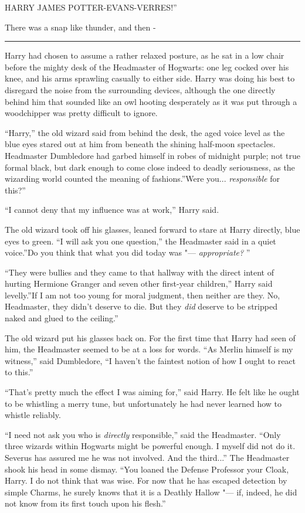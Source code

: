 HARRY JAMES POTTER-EVANS-VERRES!''

There was a snap like thunder, and then -

\begin{center}\rule{3in}{0.4pt}\end{center}

Harry had chosen to assume a rather relaxed posture, as he sat in a low
chair before the mighty desk of the Headmaster of Hogwarts: one leg
cocked over his knee, and his arms sprawling casually to either side.
Harry was doing his best to disregard the noise from the surrounding
devices, although the one directly behind him that sounded like an owl
hooting desperately as it was put through a woodchipper was pretty
difficult to ignore.

``Harry,'' the old wizard said from behind the desk, the aged voice
level as the blue eyes stared out at him from beneath the shining
half-moon spectacles. Headmaster Dumbledore had garbed himself in robes
of midnight purple; not true formal black, but dark enough to come close
indeed to deadly seriousness, as the wizarding world counted the meaning
of fashions.''Were you... \emph{responsible} for this?''

``I cannot deny that my influence was at work,'' Harry said.

The old wizard took off his glasses, leaned forward to stare at Harry
directly, blue eyes to green. ``I will ask you one question,'' the
Headmaster said in a quiet voice.''Do you think that what you did today
was "--- \emph{appropriate?} ''

``They were bullies and they came to that hallway with the direct intent
of hurting Hermione Granger and seven other first-year children,'' Harry
said levelly.''If I am not too young for moral judgment, then neither
are they. No, Headmaster, they didn't deserve to die. But they
\emph{did} deserve to be stripped naked and glued to the ceiling.''

The old wizard put his glasses back on. For the first time that Harry
had seen of him, the Headmaster seemed to be at a loss for words. ``As
Merlin himself is my witness,'' said Dumbledore, ``I haven't the
faintest notion of how I ought to react to this.''

``That's pretty much the effect I was aiming for,'' said Harry. He felt
like he ought to be whistling a merry tune, but unfortunately he had
never learned how to whistle reliably.

``I need not ask you who is \emph{directly} responsible,'' said the
Headmaster. ``Only three wizards within Hogwarts might be powerful
enough. I myself did not do it. Severus has assured me he was not
involved. And the third...'' The Headmaster shook his head in some
dismay. ``You loaned the Defense Professor your Cloak, Harry. I do not
think that was wise. For now that he has escaped detection by simple
Charms, he surely knows that it is a Deathly Hallow "--- if, indeed, he did
not know from its first touch upon his flesh.''

